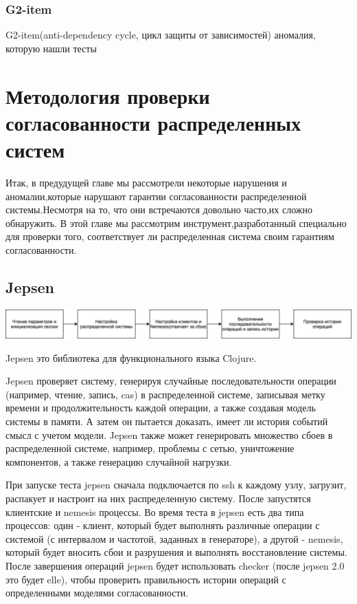 \documentclass[12pt,  openany]{book}
\begin{document}
\subsection{G2-item}
G2-item(anti-dependency cycle, цикл защиты от зависимостей)
аномалия, которую нашли тесты

\chapter{Методология проверки согласованности распределенных систем}
Итак, в предудущей главе мы рассмотрели некоторые нарушения и аномалии,которые нарушают гарантии согласованности распределенной системы.Несмотря на то, что они встречаются довольно часто,их сложно обнаружить.  В этой главе мы рассмотрим инструмент,разработанный специально для проверки того, соответствует ли распределенная система своим гарантиям согласованности.
\section{Jepsen}
\includegraphics[scale=0.175]{jepsen.jpeg}
\par
Jepsen это библиотека для функционального языка Clojure.
\par
Jepsen проверяет систему, генерируя случайные последовательности операции (например, чтение, запись, cas) в распределенной системе, записывая метку времени и продолжительность каждой операции, а также создавая модель системы в памяти. А затем он пытается доказать, имеет ли история событий смысл с учетом модели.
Jepsen также может генерировать множество сбоев в распределенной системе, например, проблемы с сетью, уничтожение компонентов, а также генерацию случайной нагрузки.
\par
При запуске теста jepsen сначала подключается по ssh к каждому узлу, загрузит, распакует и настроит на них распределенную систему.
После запустятся клиентские и nemesis процессы. Во время теста в jepsen есть два типа процессов: один - клиент, который будет выполнять различные операции с системой (с интервалом и частотой, заданных в генераторе), а другой - nemesis, который будет вносить сбои и разрушения и выполнять восстановление системы. После завершения операций jepsen будет использовать checker (после jepsen 2.0 это будет elle), чтобы проверить правильность истории операций с определенными моделями согласованности.
\end{document}
